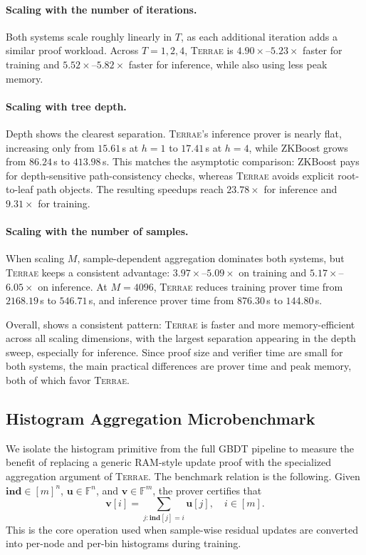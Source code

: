 \paragraph{Scaling with the number of iterations.}
Both systems scale roughly linearly in $T$, as each additional iteration adds a
similar proof workload.  Across $T=1,2,4$, \textsc{Terrae} is
$4.90\times$--$5.23\times$ faster for training and
$5.52\times$--$5.82\times$ faster for inference, while also using less peak
memory.

\paragraph{Scaling with tree depth.}
Depth shows the clearest separation.  \textsc{Terrae}'s inference prover is
nearly flat, increasing only from $15.61$\,s at $h=1$ to
$17.41$\,s at $h=4$, while ZKBoost grows from $86.24$\,s to $413.98$\,s.
This matches the asymptotic comparison: ZKBoost pays for depth-sensitive
path-consistency checks, whereas \textsc{Terrae} avoids explicit
root-to-leaf path objects.  The resulting speedups reach $23.78\times$ for
inference and $9.31\times$ for training.

\paragraph{Scaling with the number of samples.}
When scaling $M$, sample-dependent aggregation dominates both systems, but
\textsc{Terrae} keeps a consistent advantage: $3.97\times$--$5.09\times$ on
training and $5.17\times$--$6.05\times$ on inference.  At $M=4096$,
\textsc{Terrae} reduces training prover time from $2168.19$\,s to
$546.71$\,s, and inference prover time from $876.30$\,s to $144.80$\,s.

Overall,  shows a consistent pattern:
\textsc{Terrae} is faster and more memory-efficient across all scaling
dimensions, with the largest separation appearing in the depth sweep,
especially for inference.  Since proof size and verifier time are small for
both systems, the main practical differences are prover time and peak memory,
both of which favor \textsc{Terrae}.

\subsection{Histogram Aggregation Microbenchmark}
\label{subsec:histogram-microbenchmark}

We isolate the histogram primitive from the full GBDT pipeline to measure the
benefit of replacing a generic RAM-style update proof with the specialized
aggregation argument of \textsc{Terrae}. The benchmark relation is the
following. Given
$\mathbf{ind}\in[m]^n$, $\mathbf{u}\in\mathbb{F}^n$, and
$\mathbf{v}\in\mathbb{F}^m$, the prover certifies that
\[
    \mathbf{v}[i]
    =
    \sum_{j:\mathbf{ind}[j]=i}\mathbf{u}[j],
    \quad i\in[m].
\]
This is the core operation used when sample-wise residual updates are converted
into per-node and per-bin histograms during training.


